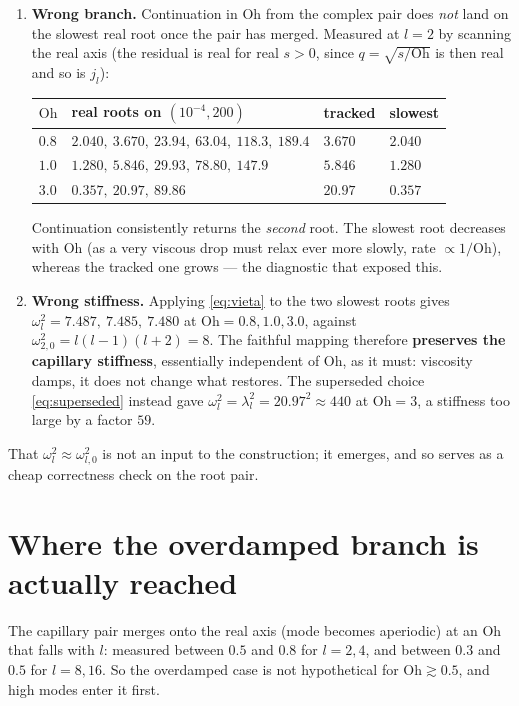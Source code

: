 \documentclass[11pt]{article}
\newcommand{\Oh}{\mathrm{Oh}}
\begin{document}
\begin{enumerate}
\item \textbf{Wrong branch.} Continuation in $\Oh$ from the complex pair does \emph{not} land
on the slowest real root once the pair has merged. Measured at $l=2$ by scanning the real
axis (the residual is real for real $s>0$, since $q=\sqrt{s/\Oh}$ is then real and so is
$j_l$):

\begin{center}
\begin{tabular}{llll}
\toprule
$\Oh$ & real roots on $(10^{-4},200)$ & tracked & slowest \\
\midrule
$0.8$ & $2.040,\ 3.670,\ 23.94,\ 63.04,\ 118.3,\ 189.4$ & $3.670$ & $2.040$ \\
$1.0$ & $1.280,\ 5.846,\ 29.93,\ 78.80,\ 147.9$ & $5.846$ & $1.280$ \\
$3.0$ & $0.357,\ 20.97,\ 89.86$ & $20.97$ & $0.357$ \\
\bottomrule
\end{tabular}
\end{center}

Continuation consistently returns the \emph{second} root. The slowest root decreases with
$\Oh$ (as a very viscous drop must relax ever more slowly, rate $\propto 1/\Oh$), whereas the
tracked one grows --- the diagnostic that exposed this.

\item \textbf{Wrong stiffness.} Applying \eqref{eq:vieta} to the two slowest roots gives
$\omega_l^2 = 7.487,\ 7.485,\ 7.480$ at $\Oh=0.8,1.0,3.0$, against
$\omega_{2,0}^2 = l(l-1)(l+2) = 8$. The faithful mapping therefore \textbf{preserves the
capillary stiffness}, essentially independent of $\Oh$, as it must: viscosity damps, it does
not change what restores. The superseded choice \eqref{eq:superseded} instead gave
$\omega_l^2=\lambda_l^2 = 20.97^2 \approx 440$ at $\Oh=3$, a stiffness too large by a factor
$59$.
\end{enumerate}

That $\omega_l^2\approx\omega_{l,0}^2$ is not an input to the construction; it emerges, and so
serves as a cheap correctness check on the root pair.

\section{Where the overdamped branch is actually reached}

The capillary pair merges onto the real axis (mode becomes aperiodic) at an $\Oh$ that falls
with $l$: measured between $0.5$ and $0.8$ for $l=2,4$, and between $0.3$ and $0.5$ for
$l=8,16$. So the overdamped case is not hypothetical for $\Oh\gtrsim0.5$, and high modes enter
it first.
\end{document}
